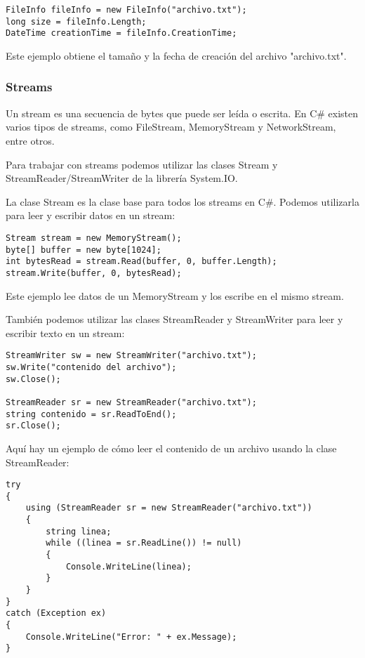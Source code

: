 \documentclass[executivepaper]{article}
\begin{document}
\begin{lstlisting}
FileInfo fileInfo = new FileInfo("archivo.txt");
long size = fileInfo.Length;
DateTime creationTime = fileInfo.CreationTime;
\end{lstlisting}

Este ejemplo obtiene el tamaño y la fecha de creación del archivo "archivo.txt".

\subsubsection*{Streams}
Un stream es una secuencia de bytes que puede ser leída o escrita. En C\# existen varios tipos de streams, como FileStream, MemoryStream y NetworkStream, entre otros.

Para trabajar con streams podemos utilizar las clases Stream y StreamReader/StreamWriter de la librería System.IO.

La clase Stream es la clase base para todos los streams en C\#. Podemos utilizarla para leer y escribir datos en un stream:

\begin{lstlisting}
Stream stream = new MemoryStream();
byte[] buffer = new byte[1024];
int bytesRead = stream.Read(buffer, 0, buffer.Length);
stream.Write(buffer, 0, bytesRead);
\end{lstlisting}

Este ejemplo lee datos de un MemoryStream y los escribe en el mismo stream.

También podemos utilizar las clases StreamReader y StreamWriter para leer y escribir texto en un stream:

\begin{lstlisting}
StreamWriter sw = new StreamWriter("archivo.txt");
sw.Write("contenido del archivo");
sw.Close();

StreamReader sr = new StreamReader("archivo.txt");
string contenido = sr.ReadToEnd();
sr.Close();
\end{lstlisting}

Aquí hay un ejemplo de cómo leer el contenido de un archivo usando la clase StreamReader:
\begin{lstlisting}
try
{
    using (StreamReader sr = new StreamReader("archivo.txt"))
    {
        string linea;
        while ((linea = sr.ReadLine()) != null)
        {
            Console.WriteLine(linea);
        }
    }
}
catch (Exception ex)
{
    Console.WriteLine("Error: " + ex.Message);
}
\end{lstlisting}
\end{document}
